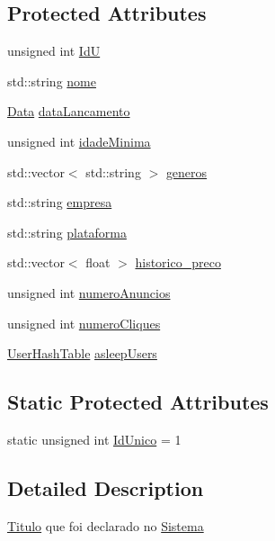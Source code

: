 \subsection*{Protected Attributes}
\begin{DoxyCompactItemize}
\item 
unsigned int \mbox{\hyperlink{class_titulo_aff7d1cc9accbc0f49c05cdc97c66844c}{IdU}}
\item 
std\+::string \mbox{\hyperlink{class_titulo_a8abdf1fc6d4fc14be20bbec247664d83}{nome}}
\item 
\mbox{\hyperlink{class_data}{Data}} \mbox{\hyperlink{class_titulo_ae540ddf2c607eb0e4de29eb8c0cca7f0}{data\+Lancamento}}
\item 
unsigned int \mbox{\hyperlink{class_titulo_a28891078f53fc3317de60ae739514955}{idade\+Minima}}
\item 
std\+::vector$<$ std\+::string $>$ \mbox{\hyperlink{class_titulo_a3209265c8534416978ee9891b96c14b2}{generos}}
\item 
std\+::string \mbox{\hyperlink{class_titulo_a91510c440dc8583d60d88ea02f4eb1b6}{empresa}}
\item 
std\+::string \mbox{\hyperlink{class_titulo_a67761eb7f006453ab0869e4b7c0a9c0b}{plataforma}}
\item 
std\+::vector$<$ float $>$ \mbox{\hyperlink{class_titulo_aad5a44ca7e83939e8b47f1e11b80eca2}{historico\+\_\+preco}}
\item 
unsigned int \mbox{\hyperlink{class_titulo_a31919af9268f0c6e55b786457d1df586}{numero\+Anuncios}}
\item 
unsigned int \mbox{\hyperlink{class_titulo_a7775da325c14a4d76f2d3b0800c28fa3}{numero\+Cliques}}
\item 
\mbox{\hyperlink{_titulo_8h_a0996281e9e5d419736dec228200cfdc5}{User\+Hash\+Table}} \mbox{\hyperlink{class_titulo_a84e7b9dc58fbba5f048a57a0878a43e8}{asleep\+Users}}
\end{DoxyCompactItemize}
\subsection*{Static Protected Attributes}
\begin{DoxyCompactItemize}
\item 
static unsigned int \mbox{\hyperlink{class_titulo_a54ff099c5e3bfbf23d4326b4acc73263}{Id\+Unico}} = 1
\end{DoxyCompactItemize}


\subsection{Detailed Description}
\mbox{\hyperlink{class_titulo}{Titulo}} que foi declarado no \mbox{\hyperlink{class_sistema}{Sistema}} 

